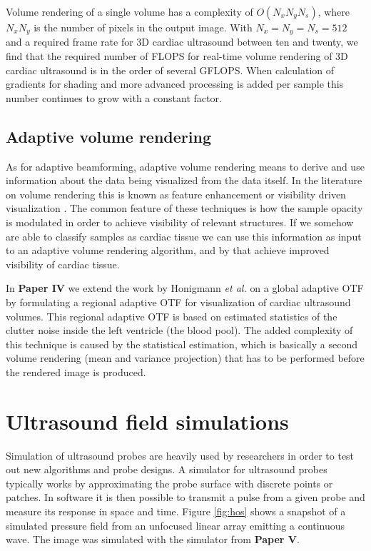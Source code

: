 Volume rendering of a single volume has a complexity of $O(N_xN_yN_s)$, where $N_xN_y$ is the number of pixels in the output image. With $N_x = N_y = N_s = 512$ and a required frame rate for 3D cardiac ultrasound between ten and twenty, we find that the required number of FLOPS for real-time volume rendering of 3D cardiac ultrasound is in the order of several GFLOPS. When calculation of gradients for shading and more advanced processing is added per sample this number continues to grow with a constant factor.

\subsection{Adaptive volume rendering}
As for adaptive beamforming, adaptive volume rendering means to derive and use information about the data being visualized from the data itself. In the literature on volume rendering this is known as feature enhancement or visibility driven visualization \cite{viola2005, correa2010visibility, marchesin2010}. The common feature of these techniques is how the sample opacity is modulated in order to achieve visibility of relevant structures. If we somehow are able to classify samples as cardiac tissue we can use this information as input to an adaptive volume rendering algorithm, and by that achieve improved visibility of cardiac tissue.

In \textbf{Paper IV} we extend the work by Honigmann \textit{et al.} \cite{Honigmann2003} on a global adaptive OTF by formulating a regional adaptive OTF for visualization of cardiac ultrasound volumes. This regional adaptive OTF is based on estimated statistics of the clutter noise inside the left ventricle (the blood pool). The added complexity of this technique is caused by the statistical estimation, which is basically a second volume rendering (mean and variance projection) that has to be performed before the rendered image is produced.

\section{Ultrasound field simulations}\label{sec:field}
Simulation of ultrasound probes are heavily used by researchers in order to test out new algorithms and probe designs. A simulator for ultrasound probes typically works by approximating the probe surface with discrete points or patches. In software it is then possible to transmit a pulse from a given probe and measure its response in space and time. Figure \ref{fig:hos} shows a snapshot of a simulated pressure field from an unfocused linear array emitting a continuous wave. The image was simulated with the simulator from \textbf{Paper V}. 

